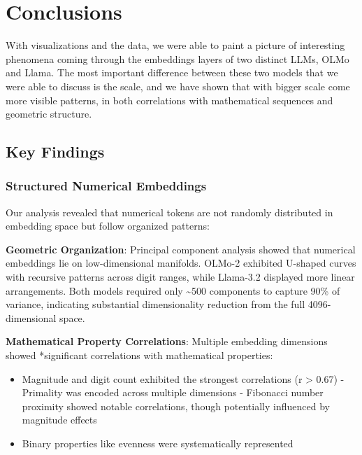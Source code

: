 \documentclass[
  a4paper, twoside, 10pt, titlepage]{book}
\providecommand{\tightlist}{%
  \setlength{\itemsep}{0pt}\setlength{\parskip}{0pt}}
\begin{document}
\chapter{Conclusions}\label{conclusions}

With visualizations and the data, we were able to paint a picture of
interesting phenomena coming through the embeddings layers of two
distinct LLMs, OLMo and Llama. The most important difference between
these two models that we were able to discuss is the scale, and we have
shown that with bigger scale come more visible patterns, in both
correlations with mathematical sequences and geometric structure.

\section{Key Findings}\label{key-findings}

\subsection{Structured Numerical
Embeddings}\label{structured-numerical-embeddings}

Our analysis revealed that numerical tokens are not randomly distributed
in embedding space but follow organized patterns:

\textbf{Geometric Organization}: Principal component analysis showed
that numerical embeddings lie on low-dimensional manifolds. OLMo-2
exhibited U-shaped curves with recursive patterns across digit ranges,
while Llama-3.2 displayed more linear arrangements. Both models required
only \textasciitilde500 components to capture 90\% of variance,
indicating substantial dimensionality reduction from the full
4096-dimensional space.

\textbf{Mathematical Property Correlations}: Multiple embedding
dimensions showed *significant correlations with mathematical
properties:

\begin{itemize}
\tightlist
\item
  Magnitude and digit count exhibited the strongest correlations (r
  \textgreater{} 0.67) - Primality was encoded across multiple
  dimensions - Fibonacci number proximity showed notable correlations,
  though potentially influenced by magnitude effects
\item
  Binary properties like evenness were systematically represented
\end{itemize}
\end{document}
